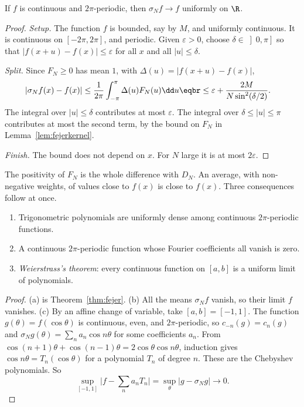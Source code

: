 \begin{theorem}[Fej\'er, 1900]\label{thm:fejer}
If $f$ is continuous and $2\pi$-periodic, then $\sigma_Nf\to f$ uniformly on $\R$.
\end{theorem}
\begin{proof}
\emph{Setup.} The function $f$ is bounded, say by $M$, and uniformly continuous. It is continuous on $[-2\pi,2\pi]$, and periodic. Given $\varepsilon>0$, choose $\delta\in\left]0,\pi\right]$ so that $|f(x+u)-f(x)|\le\varepsilon$ for all $x$ and all $|u|\le\delta$.

\emph{Split.} Since $F_N\ge0$ has mean $1$, with $\Delta(u)=|f(x+u)-f(x)|$,
\[
\begin{aligned}|\sigma_Nf(x)-f(x)|&\le\frac1{2\pi}\int_{-\pi}^\pi\Delta(u)F_N(u)\dd u\eqbr\le\varepsilon+\frac{2M}{N\sin^2(\delta/2)}.\end{aligned}
\]
The integral over $|u|\le\delta$ contributes at most $\varepsilon$. The integral over $\delta\le|u|\le\pi$ contributes at most the second term, by the bound on $F_N$ in Lemma~\ref{lem:fejerkernel}.

\emph{Finish.} The bound does not depend on $x$. For $N$ large it is at most $2\varepsilon$.
\end{proof}

The positivity of $F_N$ is the whole difference with $D_N$. An average, with non-negative weights, of values close to $f(x)$ is close to $f(x)$. Three consequences follow at once.

\begin{corollary}\label{cor:fejer}
\begin{enumerate}[label=(\alph*)]
\item Trigonometric polynomials are uniformly dense among continuous $2\pi$-periodic functions.
\item A continuous $2\pi$-periodic function whose Fourier coefficients all vanish is zero.
\item \emph{Weierstrass's theorem}: every continuous function on $[a,b]$ is a uniform limit of polynomials.
\end{enumerate}
\end{corollary}
\begin{proof}
(a) is Theorem~\ref{thm:fejer}. (b) All the means $\sigma_Nf$ vanish, so their limit $f$ vanishes. (c) By an affine change of variable, take $[a,b]=[-1,1]$. The function $g(\theta)=f(\cos\theta)$ is continuous, even, and $2\pi$-periodic, so $c_{-n}(g)=c_n(g)$ and $\sigma_Ng(\theta)=\sum_na_n\cos n\theta$ for some coefficients $a_n$. From $\cos(n+1)\theta+\cos(n-1)\theta=2\cos\theta\cos n\theta$, induction gives $\cos n\theta=T_n(\cos\theta)$ for a polynomial $T_n$ of degree $n$. These are the Chebyshev polynomials. So
\[
\sup_{[-1,1]}\bigl|f-\sum_na_nT_n\bigr|=\sup_\theta|g-\sigma_Ng|\to0.
\]
\end{proof}

